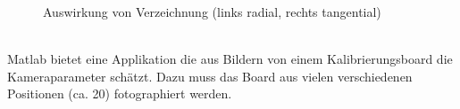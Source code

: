 \begin{figure}[ht]
\centering
    \caption{Auswirkung von Verzeichnung (links radial, rechts tangential) \cite{Verlag}}
\end{figure}
\\
Matlab bietet eine Applikation die aus Bildern von einem Kalibrierungsboard die Kameraparameter schätzt. Dazu muss das Board aus vielen verschiedenen Positionen (ca. 20) fotographiert werden. 

